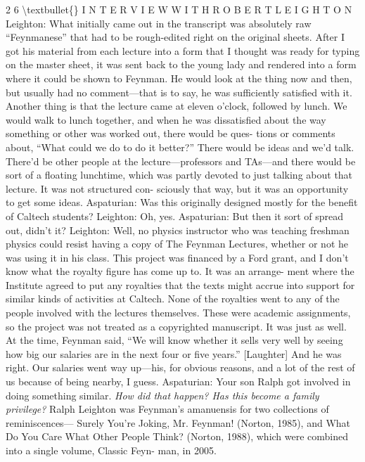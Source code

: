 \documentclass[10pt,oneside]{article}
\begin{document}
2 6 \textbackslash{}textbullet\{\} I N T E R V I E W  W I T H  R O B E R T  L E I G H T O N Leighton: What initially came out in the transcript was absolutely raw “Feynmanese” that had to be rough-edited right on the original sheets. After I got his material from each lecture into a form that I thought was ready for typing on the master sheet, it was sent back to the young lady and rendered into a form where it could be shown to Feynman. He would look at the thing now and then, but usually had no comment---that is to say, he was sufficiently satisfied with it. Another thing is that the lecture came at eleven o’clock, followed by lunch. We would walk to lunch together, and when he was dissatisfied about the way something or other was worked out, there would be ques- tions or comments about, “What could we do to do it better?” There would be ideas and we’d talk. There’d be other people at the lecture---professors and TAs---and there would be sort of a floating lunchtime, which was partly devoted to just talking about that lecture. It was not structured con- sciously that way, but it was an opportunity to get some ideas. Aspaturian: Was this originally designed mostly for the benefit of Caltech students? Leighton: Oh, yes. Aspaturian: But then it sort of spread out, didn’t it? Leighton: Well, no physics instructor who was teaching freshman physics could resist having a copy of The Feynman Lectures, whether or not he was using it in his class. This project was financed by a Ford grant, and I don’t know what the royalty figure has come up to. It was an arrange- ment where the Institute agreed to put any royalties that the texts might accrue into support for similar kinds of activities at Caltech. None of the royalties went to any of the people involved with the lectures themselves. These were academic assignments, so the project was not treated as a copyrighted manuscript. It was just as well. At the time, Feynman said, “We will know whether it sells very well by seeing how big our salaries are in the next four or five years.” [Laughter] And he was right. Our salaries went way up---his, for obvious reasons, and a lot of the rest of us because of being nearby, I guess. Aspaturian: Your son Ralph got involved in doing something similar.\emph{ How did that happen? Has this become a family privilege? } Ralph Leighton was Feynman’s amanuensis for two collections of reminiscences--- Surely You’re Joking, Mr. Feynman! (Norton, 1985), and What Do You Care What Other People Think? (Norton, 1988), which were combined into a single volume, Classic Feyn- man, in 2005.\par
\end{document}
